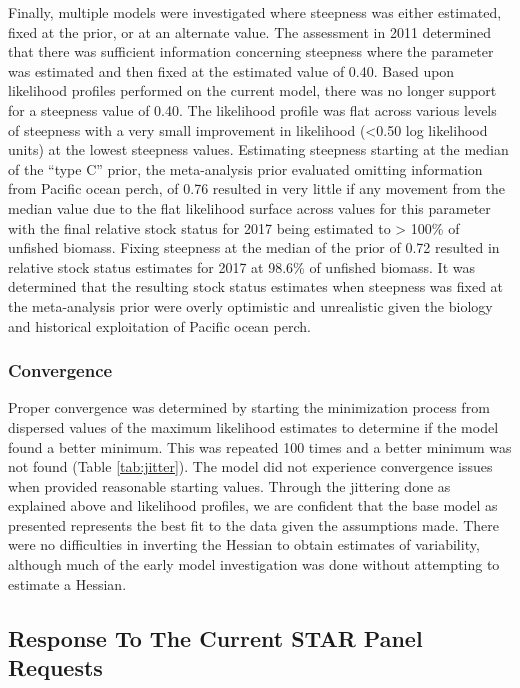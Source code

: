 \documentclass[12pt,]{article}
\begin{document}
Finally, multiple models were investigated where steepness was either
estimated, fixed at the prior, or at an alternate value. The assessment
in 2011 determined that there was sufficient information concerning
steepness where the parameter was estimated and then fixed at the
estimated value of 0.40. Based upon likelihood profiles performed on the
current model, there was no longer support for a steepness value of
0.40. The likelihood profile was flat across various levels of steepness
with a very small improvement in likelihood (\textless{}0.50 log
likelihood units) at the lowest steepness values. Estimating steepness
starting at the median of the ``type C'' prior, the meta-analysis prior
evaluated omitting information from Pacific ocean perch, of 0.76
resulted in very little if any movement from the median value due to the
flat likelihood surface across values for this parameter with the final
relative stock status for 2017 being estimated to \textgreater{} 100\%
of unfished biomass. Fixing steepness at the median of the prior of 0.72
resulted in relative stock status estimates for 2017 at 98.6\% of
unfished biomass. It was determined that the resulting stock status
estimates when steepness was fixed at the meta-analysis prior were
overly optimistic and unrealistic given the biology and historical
exploitation of Pacific ocean perch.

\subsubsection{Convergence}\label{convergence}

Proper convergence was determined by starting the minimization process
from dispersed values of the maximum likelihood estimates to determine
if the model found a better minimum. This was repeated 100 times and a
better minimum was not found (Table \ref{tab:jitter}). The model did not
experience convergence issues when provided reasonable starting values.
Through the jittering done as explained above and likelihood profiles,
we are confident that the base model as presented represents the best
fit to the data given the assumptions made. There were no difficulties
in inverting the Hessian to obtain estimates of variability, although
much of the early model investigation was done without attempting to
estimate a Hessian.

\subsection{Response To The Current STAR Panel
Requests}\label{response-to-the-current-star-panel-requests}
\end{document}
